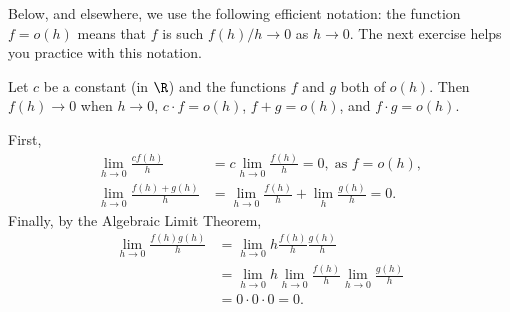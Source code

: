 Below, and elsewhere, we use the following efficient notation:  the function $f=o(h)$ means that $f$ is such $f(h)/h \to 0$ as $h\to 0$.  The next exercise helps you practice with this notation.
\begin{exercise}
  Let $c$ be a constant (in $\R$) and the functions $f$ and $g$ both of $o(h)$. Then $f(h) \to 0$ when $h\to 0$, $c\cdot f = o(h)$, $f+g=o(h)$, and $f\cdot g=o(h)$. 
 \begin{solution}
First,
\begin{align*}
\lim_{h\to 0} \frac{c f(h)}{h} &=  c \lim_{h\to 0} \frac{f(h)}{h} = 0, \; \text{as } f = o(h), \\
\lim_{h\to 0} \frac{f(h) + g(h)} h &= \lim_{h\to 0} \frac{f(h)} h + \lim_h \frac{g(h)} h = 0.
\end{align*}
Finally, by the Algebraic Limit Theorem,
\begin{align*}
\lim_{h\to 0} \frac{f(h)g(h)}{h} &= \lim_{h\to 0} h \frac{f(h)}{h} \frac{g(h)}{h} \\
&= \lim_{h\to 0} h \lim_{h\to 0} \frac{f(h)}{h} \lim_{h\to 0} \frac{g(h)}{h} \\
&= 0 \cdot 0 \cdot 0 = 0.
\end{align*}
  \end{solution}
\end{exercise}


